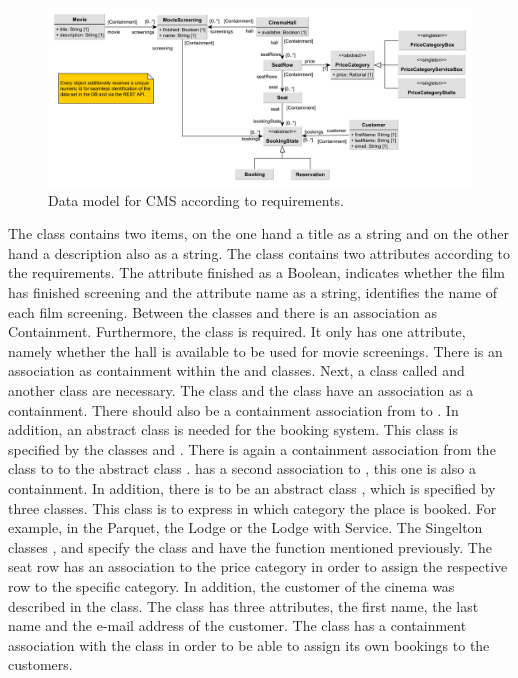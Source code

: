 \begin{figure}[H]
    \centering
    \includegraphics[width=\textwidth]{images/data-model-final-with-price}
    \caption{Data model for CMS according to requirements.}
    \label{fig:data-model}
\end{figure}

The class  contains two items, on the one hand a title as a string and on the other hand a description also as a string. The  class contains two attributes according to the requirements. The attribute finished as a Boolean, indicates whether the film has finished screening and the attribute name as a string, identifies the name of each film screening. Between the classes  and  there is an association as Containment. Furthermore, the  class is required. It only has one attribute, namely whether the hall is available to be used for movie screenings. There is an association as containment within the  and  classes. Next, a class called  and another class  are necessary. The  class and the  class have an association as a containment. There should also be a containment association from  to . In addition, an abstract class  is needed for the booking system. This class is specified by the classes  and . There is again a containment association from the class to  to the abstract class .  has a second association to , this one is also a containment. 
In addition, there is to be an abstract class , which is specified by three classes. This class is to express in which category the place is booked. For example, in the Parquet, the Lodge or the Lodge with Service. The Singelton classes ,  and  specify the class  and have the function mentioned previously. The seat row has an association to the price category in order to assign the respective row to the specific category. In addition, the customer of the cinema was described in the  class. The class has three attributes, the first name, the last name and the e-mail address of the customer. The  class has a containment association with the  class in order to be able to assign its own bookings to the customers.

